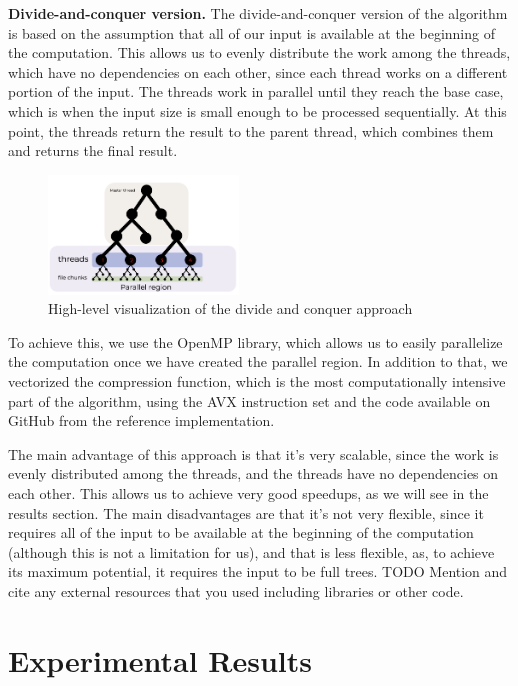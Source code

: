 \documentclass[letterpaper]{article}
\newcommand{\mypar}[1]{{\bf #1.}}
\begin{document}
\mypar{Divide-and-conquer version}
The divide-and-conquer version of the algorithm is based on the assumption that all of our input is available at the beginning of the computation.
This allows us to evenly distribute the work among the threads, which have no dependencies on each other, since each thread works on a different portion of the input.
The threads work in parallel until they reach the base case, which is when the input size is small enough to be processed sequentially.
At this point, the threads return the result to the parent thread, which combines them and returns the final result.
\begin{figure}[h]
  \begin{center}
    \includegraphics[width=0.45\textwidth]{figures/div_conq.png}
  \end{center}
  \caption{High-level visualization of the divide and conquer approach}\label{fig:divide_and_conquer}
\end{figure}

To achieve this, we use the OpenMP library, which allows us to easily parallelize the computation once we have created the parallel region.
In addition to that, we vectorized the compression function, which is the most computationally intensive part of the algorithm, using the AVX instruction set and the code available on GitHub from the reference implementation.

The main advantage of this approach is that it's very scalable, since the work is evenly distributed among the threads, and the threads have no dependencies on each other. This allows us to achieve very good speedups, as we will see in the results section.
The main disadvantages are that it's not very flexible, since it requires all of the input to be available at the beginning of the computation (although this is not a limitation for us), and that is less flexible, as, to achieve its maximum potential,
it requires the input to be full trees.
TODO Mention and cite any external resources that you used including libraries or other code.

\section{Experimental Results}\label{sec:exp}
\end{document}
